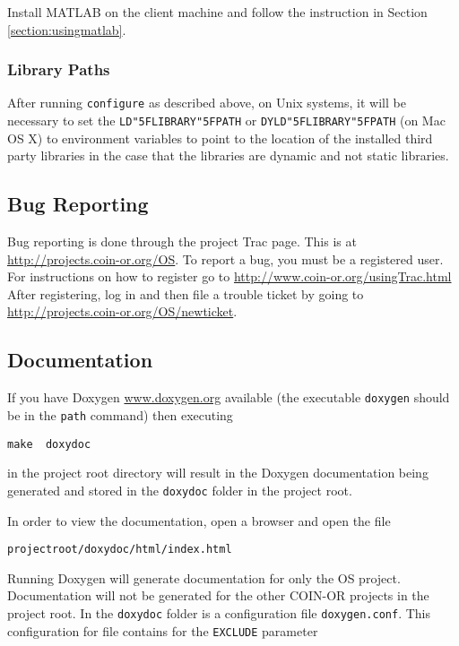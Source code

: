 \documentclass[11pt]{article}
\renewcommand{\_}{{\char"5F}}
\renewcommand{\{}{{\char"7B}}
\renewcommand{\}}{{\char"7D}}
\renewcommand{\^}{{\char"0D}}
\renewcommand{\'}{{\char"0D}}
\begin{document}
Install MATLAB on the client machine and follow the instruction in Section
 \ref{section:usingmatlab}.

\subsubsection{Library Paths}

After running {\tt configure} as described above,  on Unix systems, it will be necessary to set the {\tt LD\_LIBRARY\_PATH} or {\tt DYLD\_LIBRARY\_PATH} (on Mac OS X) to environment variables to point to the location of the installed third party libraries in the case that the libraries are dynamic and not static libraries. 


\subsection{Bug Reporting}

Bug reporting is done through the project Trac page. This is at \url{http://projects.coin-or.org/OS}.  To report a bug, you must be a registered user.  For  instructions on  how to register go to 
 \url{http://www.coin-or.org/usingTrac.html}  After registering, log in and then file a trouble ticket by going to \url{http://projects.coin-or.org/OS/newticket}.
 
 
\subsection{Documentation}\label{section:documentation}

If you have Doxygen  \url{www.doxygen.org} available (the executable {\tt doxygen} should be in the {\tt path} command) then executing
\begin{verbatim}
make  doxydoc
\end{verbatim}
in the project root directory will result in the Doxygen documentation being generated and stored in the {\tt doxydoc} folder in the project root. 

In order to view the documentation, open a browser and open the file 
\begin{verbatim}
projectroot/doxydoc/html/index.html
\end{verbatim}

Running Doxygen will generate documentation for only the  OS project.  Documentation will not be generated for the other COIN-OR projects in the project root. In the {\tt doxydoc}  folder is a configuration file {\tt doxygen.conf}.  This configuration for file contains for the {\tt EXCLUDE} parameter
\end{document}
